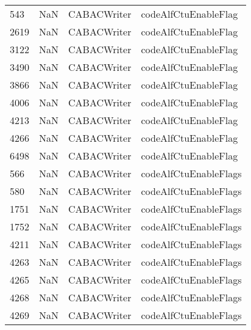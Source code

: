 \begin{tabular}{llll}
543  &                   NaN &                CABACWriter &                      codeAlfCtuEnableFlag \\
2619 &                   NaN &                CABACWriter &                      codeAlfCtuEnableFlag \\
3122 &                   NaN &                CABACWriter &                      codeAlfCtuEnableFlag \\
3490 &                   NaN &                CABACWriter &                      codeAlfCtuEnableFlag \\
3866 &                   NaN &                CABACWriter &                      codeAlfCtuEnableFlag \\
4006 &                   NaN &                CABACWriter &                      codeAlfCtuEnableFlag \\
4213 &                   NaN &                CABACWriter &                      codeAlfCtuEnableFlag \\
4266 &                   NaN &                CABACWriter &                      codeAlfCtuEnableFlag \\
6498 &                   NaN &                CABACWriter &                      codeAlfCtuEnableFlag \\
566  &                   NaN &                CABACWriter &                     codeAlfCtuEnableFlags \\
580  &                   NaN &                CABACWriter &                     codeAlfCtuEnableFlags \\
1751 &                   NaN &                CABACWriter &                     codeAlfCtuEnableFlags \\
1752 &                   NaN &                CABACWriter &                     codeAlfCtuEnableFlags \\
4211 &                   NaN &                CABACWriter &                     codeAlfCtuEnableFlags \\
4263 &                   NaN &                CABACWriter &                     codeAlfCtuEnableFlags \\
4265 &                   NaN &                CABACWriter &                     codeAlfCtuEnableFlags \\
4268 &                   NaN &                CABACWriter &                     codeAlfCtuEnableFlags \\
4269 &                   NaN &                CABACWriter &                     codeAlfCtuEnableFlags \\

\end{tabular}

